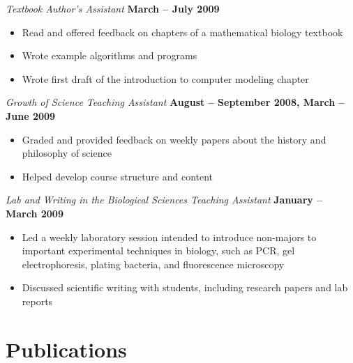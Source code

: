 \documentclass[margin,line]{resume}
\begin{document}
\begin{resume}
    \textsl{Textbook Author's Assistant} \hfill \textbf{March -- July 2009}\vspace{1mm}%
    \begin{itemize}
    \item Read and offered feedback on chapters of a mathematical biology textbook
    \item Wrote example algorithms and programs
    \item Wrote first draft of the introduction to computer modeling chapter
    \end{itemize}

    \textsl{Growth of Science Teaching Assistant} \hfill \textbf{August -- September 2008, March -- June 2009}
    \begin{itemize}
    \item Graded and provided feedback on weekly papers about the history and philosophy of science
    \item Helped develop course structure and content
    \end{itemize}

    \textsl{Lab and Writing in the Biological Sciences Teaching Assistant} \hfill \textbf{January -- March 2009}\vspace{1mm}%
    \begin{itemize}
    \item Led a weekly laboratory session intended to introduce non-majors to important experimental techniques in biology, such as PCR, gel electrophoresis, plating bacteria, and fluorescence microscopy
    \item Discussed scientific writing with students, including research papers and lab reports 
    \end{itemize}

    \section{\mysidestyle Publications}


\end{resume}
\end{document}
